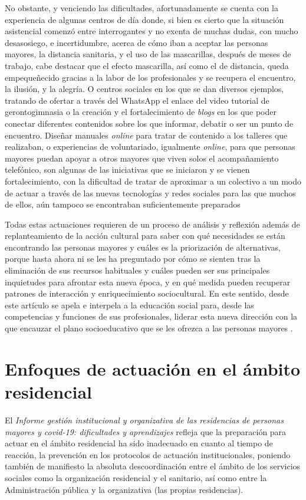 \documentclass{textolivre}
\begin{document}
No obstante, y venciendo las dificultades, afortunadamente se cuenta con la experiencia de algunas centros de día donde, si bien es cierto que la situación asistencial comenzó entre interrogantes y no exenta de muchas dudas, con mucho desasosiego, e incertidumbre, acerca de cómo iban a aceptar las personas mayores, la distancia sanitaria, y el uso de las mascarillas, después de meses de trabajo, cabe destacar que el efecto mascarilla, así como el de distancia, queda empequeñecido gracias a la labor de los profesionales y se recupera el encuentro, la ilusión, y la alegría. O centros sociales en los que se dan diversos ejemplos, tratando de ofertar a través del WhatsApp el enlace del video tutorial de gerontogimnasia o la creación y el fortalecimiento  de \emph{blogs} en los que poder conectar diferentes contenidos sobre los que informar, debatir o ser un punto de encuentro. Diseñar manuales \emph{online} para tratar de contenido a los talleres que realizaban,  o experiencias de voluntariado, igualmente \emph{online}, para que personas mayores puedan apoyar a otros mayores que viven solos el acompañamiento telefónico, son algunas de las iniciativas que se iniciaron y se vienen fortalecimiento, con la dificultad de tratar de aproximar a un colectivo a un modo de actuar a través de las nuevas tecnologías y redes sociales para las que muchos de ellos, aún tampoco se encontraban suficientemente preparados

Todas estas actuaciones requieren de un proceso de análisis y reflexión además de replanteamiento de la acción cultural para saber con qué necesidades se están encontrando las personas mayores y cuáles es la priorización de alternativas, porque hasta ahora ni se les ha preguntado por cómo se sienten tras la eliminación de sus recursos habituales y cuáles pueden ser sus principales inquietudes para afrontar esta nueva época, y en qué medida pueden recuperar patrones de interacción y enriquecimiento sociocultural. En este sentido, desde este artículo se apela e interpela a la educación social para, desde las competencias y funciones de sus profesionales, liderar esta nueva dirección con la que encauzar el plano socioeducativo que se les ofrezca a las personas mayores \cite{caride2020}. %

\section{Enfoques de actuación en el ámbito residencial}
El \emph{Informe gestión institucional y organizativa de las residencias de personas mayores y covid-19: dificultades y aprendizajes} \cite{del_pino2020} refleja que la preparación para actuar en el ámbito residencial ha sido inadecuado en cuanto al tiempo de reacción, la prevención en los protocolos de actuación institucionales, poniendo también de manifiesto la absoluta descoordinación entre el ámbito de los servicios sociales como la organización residencial y el sanitario, así como entre la Administración pública y la organizativa (las propias residencias).
\end{document}
